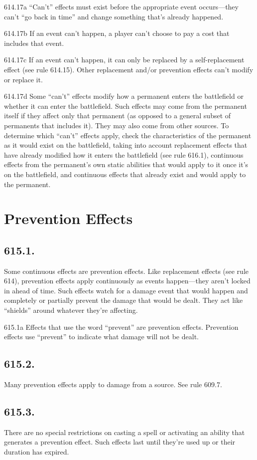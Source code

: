 614.17a “Can’t” effects must exist before the appropriate event occurs—they can’t “go back in time” and change something that’s already happened.

614.17b If an event can’t happen, a player can’t choose to pay a cost that includes that event.

614.17c If an event can’t happen, it can only be replaced by a self-replacement effect (see rule 614.15). Other replacement and/or prevention effects can’t modify or replace it.

614.17d Some “can’t” effects modify how a permanent enters the battlefield or whether it can enter the battlefield. Such effects may come from the permanent itself if they affect only that permanent (as opposed to a general subset of permanents that includes it). They may also come from other sources. To determine which “can’t” effects apply, check the characteristics of the permanent as it would exist on the battlefield, taking into account replacement effects that have already modified how it enters the battlefield (see rule 616.1), continuous effects from the permanent’s own static abilities that would apply to it once it’s on the battlefield, and continuous effects that already exist and would apply to the permanent.

\section{Prevention Effects}
\subsection*{615.1.}
Some continuous effects are prevention effects. Like replacement effects (see rule 614), prevention effects apply continuously as events happen—they aren’t locked in ahead of time. Such effects watch for a damage event that would happen and completely or partially prevent the damage that would be dealt. They act like “shields” around whatever they’re affecting.

615.1a Effects that use the word “prevent” are prevention effects. Prevention effects use “prevent” to indicate what damage will not be dealt.

\subsection*{615.2.}
Many prevention effects apply to damage from a source. See rule 609.7.

\subsection*{615.3.}
There are no special restrictions on casting a spell or activating an ability that generates a prevention effect. Such effects last until they’re used up or their duration has expired.

